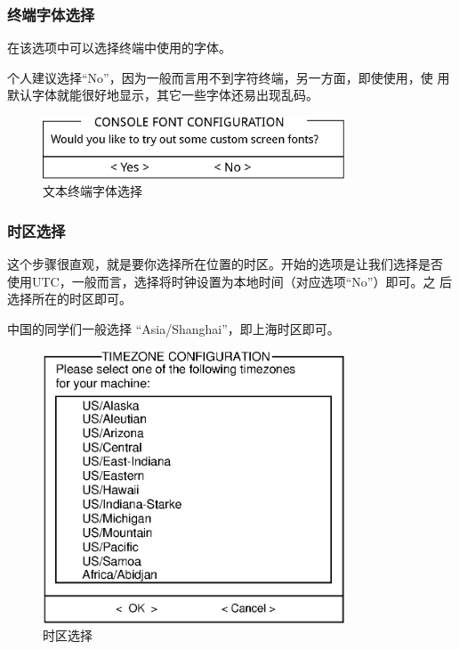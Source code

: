 \subsubsection{终端字体选择}
\label{sec:installation:setup:configure:consoleFont}
在该选项中可以选择终端中使用的字体。

个人建议选择``No''，因为一般而言用不到字符终端，另一方面，即使使用，使
用默认字体就能很好地显示，其它一些字体还易出现乱码。

\begin{figure}[htpb]
  \centering
  \includegraphics[width=0.8\textwidth]{images/installation/console-font.eps}
  \caption{文本终端字体选择}
  \label{fig:console-font}
\end{figure}

\subsubsection{时区选择}
\label{sec:installation:setup:configure:timezone}

这个步骤很直观，就是要你选择所在位置的时区。开始的选项是让我们选择是否
使用UTC，一般而言，选择将时钟设置为本地时间（对应选项``No''）即可。之
后选择所在的时区即可。

中国的同学们一般选择
``Asia/Shanghai''，即上海时区即可。
\begin{figure}[htpb]
  \centering
  \includegraphics[width=0.8\textwidth]{images/installation/setup-timezone.eps}
  \caption{时区选择}
  \label{fig:setup-timezone}
\end{figure}

